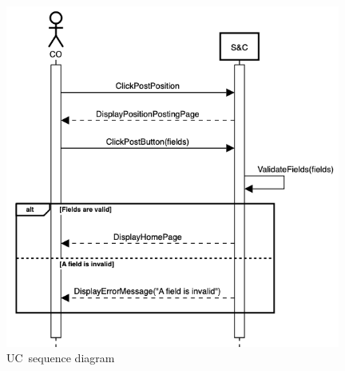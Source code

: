 \begin{figure}
    \centering
    \includegraphics[width=11cm]{images/sequence-diagrams/company-posts-position.png}
    \caption{UC\theuc\ sequence diagram}
\end{figure}


